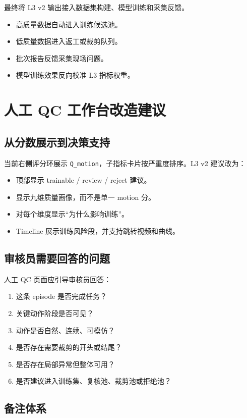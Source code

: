 \documentclass[UTF8,zihao=-4]{ctexart}
\begin{document}
最终将 L3 v2 输出接入数据集构建、模型训练和采集反馈。

\begin{itemize}
  \item 高质量数据自动进入训练候选池。
  \item 低质量数据进入返工或裁剪队列。
  \item 批次报告反馈采集现场问题。
  \item 模型训练效果反向校准 L3 指标权重。
\end{itemize}

\section{人工 QC 工作台改造建议}

\subsection{从分数展示到决策支持}

当前右侧评分环展示 \texttt{Q\_motion}，子指标卡片按严重度排序。L3 v2 建议改为：

\begin{itemize}
  \item 顶部显示 trainable / review / reject 建议。
  \item 显示九维质量画像，而不是单一 motion 分。
  \item 对每个维度显示“为什么影响训练”。
  \item Timeline 展示训练风险段，并支持跳转视频和曲线。
\end{itemize}

\subsection{审核员需要回答的问题}

人工 QC 页面应引导审核员回答：

\begin{enumerate}
  \item 这条 episode 是否完成任务？
  \item 关键动作阶段是否可见？
  \item 动作是否自然、连续、可模仿？
  \item 是否存在需要裁剪的开头或结尾？
  \item 是否存在局部异常但整体可用？
  \item 是否建议进入训练集、复核池、裁剪池或拒绝池？
\end{enumerate}

\subsection{备注体系}
\end{document}
